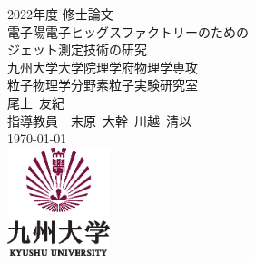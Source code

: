\documentclass[12pt, openany]{jsbook}
\begin{document}
\begin{titlepage}
 \begin{center}
  {\Large 2022年度 修士論文} \\ 
  \vspace*{125pt}
  {\Large 電子陽電子ヒッグスファクトリーのための\\ジェット測定技術の研究}\\[11pt]
  {\large 九州大学大学院理学府物理学専攻 \\ 粒子物理学分野素粒子実験研究室} \\[15pt]
  \vspace{40pt}
  {\large  尾上\ 友紀 \\[1ex] 指導教員\ \ 末原\ 大幹\ 川越\ 清以 } \\[1em]
  \today\\
 \vspace{100pt}
  \includegraphics[width=3cm]{Figure/Introduction/KyushuUniversityLogo.eps}
 \end{center}
\end{titlepage}

\thispagestyle{empty}　\newpage

\thispagestyle{empty}　\newpage
\pagestyle{headings}
\tableofcontents
\listoffigures
\listoftables












\end{document}
